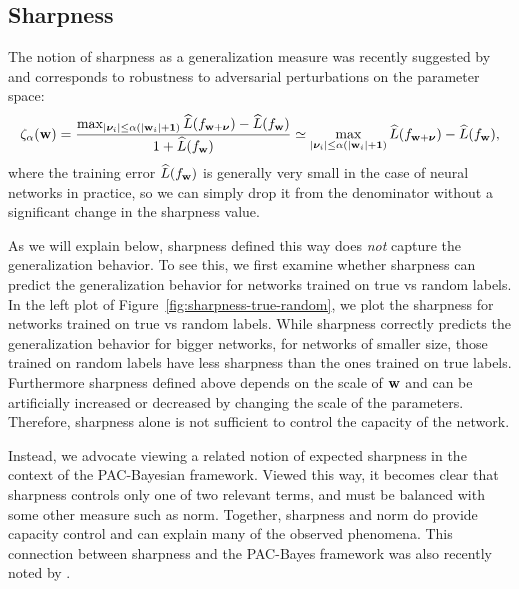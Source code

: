 \documentclass{article}
\begin{document}
\subsection{Sharpness}
The notion of sharpness as a generalization measure was recently suggested by \citet{keskar2016large} and corresponds to robustness to adversarial perturbations on the parameter space:
\begin{equation}
\zeta_\alpha(\mathbf{w}) = \frac{\max_{\left\lvert{\boldsymbol{\nu}_i}\right\rvert\leq \alpha (\left\lvert{\mathbf{w}_i}\right\rvert+\mathbf{1})}\widehat{L}(f_{\mathbf{w}+\boldsymbol{\nu}}) - \widehat{L}(f_{\mathbf{w}})}{1+\widehat{L}(f_{\mathbf{w}})} \simeq \max_{\left\lvert{\boldsymbol{\nu}_i}\right\rvert\leq \alpha (\left\lvert{\mathbf{w}_i}\right\rvert+\mathbf{1})}\widehat{L}(f_{\mathbf{w}+\boldsymbol{\nu}}) - \widehat{L}(f_{\mathbf{w}}),
\end{equation}
where the training error $\widehat{L}(f_{\mathbf{w}})$ is generally very small in the case of neural networks in practice, so we can simply drop it from the denominator without a significant change in the sharpness value. 

As we will explain below, sharpness defined this way does {\em not}
capture the generalization behavior. To see this, we first examine
whether sharpness can predict the generalization behavior for networks
trained on true vs random labels. In the left plot of
Figure~\ref{fig:sharpness-true-random}, we plot the sharpness for
networks trained on true vs random labels.  While sharpness correctly
predicts the generalization behavior for bigger networks, for networks
of smaller size, those trained on random labels have less sharpness
than the ones trained on true labels.  Furthermore sharpness defined
above depends on the scale of $\mathbf{w}$ and can be artificially
increased or decreased by changing the scale of the parameters.
Therefore, sharpness alone is not sufficient to control the capacity
of the network. 

Instead, we advocate viewing a related notion of expected sharpness in
the context of the PAC-Bayesian framework.  Viewed this way, it
becomes clear that sharpness controls only one of two relevant terms,
and must be balanced with some other measure such as norm.  Together,
sharpness and norm do provide capacity control and can explain many of
the observed phenomena.  This connection between sharpness and the
PAC-Bayes framework was also recently noted by \citet{dziugaite2017computing}. 
\end{document}
